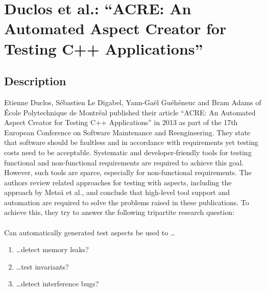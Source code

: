 \newpage
\section{Duclos et al.: “ACRE: An Automated Aspect Creator for Testing C++ Applications” } \label{found}

\subsection{Description}

Etienne Duclos, Sébastien Le Digabel, Yann-Gaël Guéhéneuc and Bram Adams \cite{Duclos} of École Polytechnique de Montréal published their article “ACRE: An Automated Aspect Creator for Testing C++ Applications” in 2013 as part of the 17th European Conference on Software Maintenance and Reengineering. They state that software should be faultless and in accordance with requirements yet testing costs need to be acceptable. Systematic and developer-friendly tools for testing functional and non-functional requirements are required to achieve this goal. However, such tools are sparce, especially for non-functional requirements. The authors review related approaches for testing with aspects, including the approach by Metsä et al., and conclude that high-level tool support and automation are required to solve the problems raised in these publications. To achieve this, they try to answer the following tripartite research question:\\
\\
Can automatically generated test aspects be used to \dots
\begin{enumerate}
\item \dots detect memory leaks?
\item \dots test invariants?  
\item \dots detect interference bugs?
\end{enumerate}

